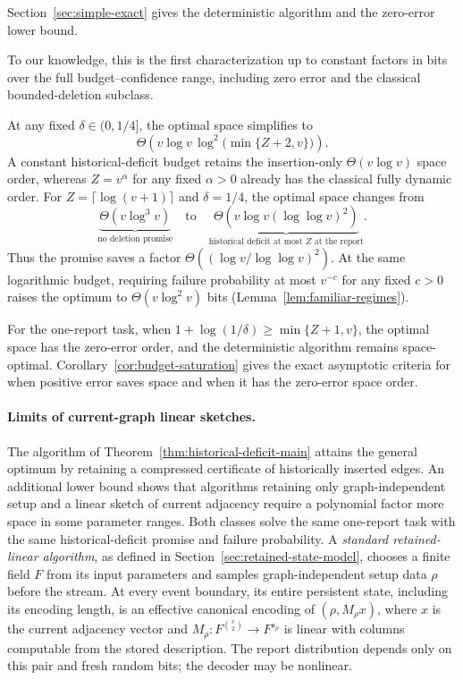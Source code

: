 \documentclass[11pt,letterpaper]{article}
\numberwithin{equation}{section}
\begin{document}
Section~\ref{sec:simple-exact} gives the deterministic algorithm and the zero-error lower bound.

To our knowledge, this is the first characterization up to constant factors in bits over the full budget--confidence range, including zero error and the classical bounded-deletion subclass.

At any fixed $\delta\in(0,1/4]$, the optimal space simplifies to
\begin{equation}
\Theta\!\left(v\log v\,\log^2\!\bigl(\min\{Z+2,v\}\bigr)\right).
\label{eq:graph-randomized-main}
\end{equation}
A constant historical-deficit budget retains the insertion-only $\Theta(v\log v)$ space order, whereas $Z=v^\alpha$ for any fixed $\alpha>0$ already has the classical fully dynamic order.
For $Z=\lceil\log(v+1)\rceil$ and $\delta=1/4$, the optimal space changes from
\[
 \underbrace{\Theta(v\log^3v)}_{\text{no deletion promise}}
 \quad\text{to}\quad
 \underbrace{\Theta\!\left(v\log v(\log\log v)^2\right)}_{\text{historical deficit at most }Z\text{ at the report}}.
\]
Thus the promise saves a factor $\Theta((\log v/\log\log v)^2)$.
At the same logarithmic budget, requiring failure probability at most $v^{-c}$ for any fixed $c>0$ raises the optimum to $\Theta(v\log^2v)$ bits (Lemma~\ref{lem:familiar-regimes}).

For the one-report task, when $1+\log(1/\delta)\ge\min\{Z+1,v\}$, the optimal space has the zero-error order, and the deterministic algorithm remains space-optimal.
Corollary~\ref{cor:budget-saturation} gives the exact asymptotic criteria for when positive error saves space and when it has the zero-error space order.

\paragraph{Limits of current-graph linear sketches.}
The algorithm of Theorem~\ref{thm:historical-deficit-main} attains the general optimum by retaining a compressed certificate of historically inserted edges.
An additional lower bound shows that algorithms retaining only graph-independent setup and a linear sketch of current adjacency require a polynomial factor more space in some parameter ranges.
Both classes solve the same one-report task with the same historical-deficit promise and failure probability.
A \emph{standard retained-linear algorithm}, as defined in Section~\ref{sec:retained-state-model}, chooses a finite field $F$ from its input parameters and samples graph-independent setup data $\rho$ before the stream.
At every event boundary, its entire persistent state, including its encoding length, is an effective canonical encoding of $(\rho,M_\rho x)$, where $x$ is the current adjacency vector and $M_\rho:F^{\binom v2}\to F^{s_\rho}$ is linear with columns computable from the stored description.
The report distribution depends only on this pair and fresh random bits; the decoder may be nonlinear.
\end{document}
